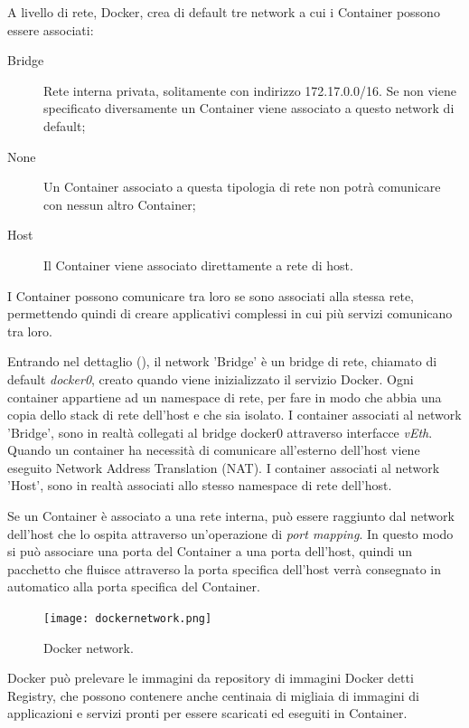 A livello di rete, Docker, crea di default tre network a cui i Container possono essere associati:
\begin{description}
    \item[Bridge] Rete interna privata, solitamente con indirizzo 172.17.0.0/16. Se non viene specificato diversamente un Container viene associato a questo network di default;
    \item[None] Un Container associato a questa tipologia di rete non potrà comunicare con nessun altro Container;
    \item[Host] Il Container viene associato direttamente a rete di host.
\end{description}

I Container possono comunicare tra loro se sono associati alla stessa rete, permettendo quindi di creare applicativi complessi in cui più servizi comunicano tra loro.

Entrando nel dettaglio (), il network 'Bridge' è un bridge di rete, chiamato di default \textit{docker0}, creato quando viene inizializzato il servizio Docker. Ogni container appartiene ad un namespace di rete, per fare in modo che abbia una copia dello stack di rete dell'host e che sia isolato.
I container associati al network 'Bridge', sono  in realtà collegati al bridge docker0 attraverso interfacce \textit{vEth}. Quando un container ha necessità di comunicare all'esterno dell'host viene eseguito Network Address Translation (NAT).
I container associati al network 'Host', sono in realtà associati allo stesso namespace di rete dell'host. 

Se un Container è associato a una rete interna, può essere raggiunto dal network dell'host che lo ospita attraverso un'operazione di \textit{port mapping}. In questo modo si può associare una porta del Container a una porta dell'host, quindi un pacchetto che fluisce attraverso la porta specifica dell'host verrà consegnato in automatico alla porta specifica del Container.

\begin{figure}[hbtp]
    \centering
    \texttt{[image: dockernetwork.png]}
    \caption{Docker network.}
    \label{fig:dockernetwork}
\end{figure}


Docker può prelevare le immagini da repository di immagini Docker detti Registry, che possono contenere anche centinaia di migliaia di immagini di applicazioni e servizi pronti per essere scaricati ed eseguiti in Container.

